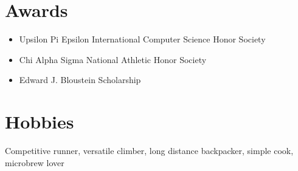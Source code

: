 \documentclass[10.5pt,a4paper,sans]{moderncv}        %
\begin{document}
\section{Awards}
\begin{itemize}
\item Upsilon Pi Epsilon International Computer Science Honor Society
\item Chi Alpha Sigma National Athletic Honor Society
\item Edward J. Bloustein Scholarship
\end{itemize}

\section{Hobbies}
Competitive runner, versatile climber, long distance backpacker, simple cook, microbrew lover


\clearpage
\end{document}
